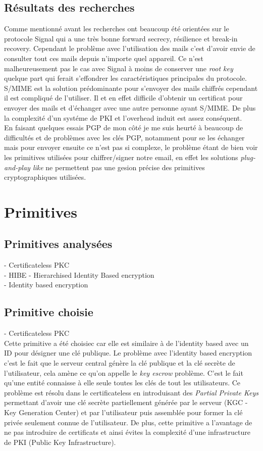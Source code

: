 \subsection{Résultats des recherches}
Comme mentionné avant les recherches ont beaucoup été orientées sur le protocole Signal qui a une très bonne forward secrecy, résilience et break-in recovery. Cependant le problème avec l'utilisation des mails c'est d'avoir envie de consulter tout ces mails depuis n'importe quel appareil. Ce n'est malheureusement pas le cas avec Signal à moins de conserver une \textit{root key} quelque part qui ferait s'effondrer les caractéristiques principales du protocole.\\
S/MIME est la solution prédominante pour s'envoyer des mails chiffrés cependant il est compliqué de l'utiliser. Il et en effet difficile d'obtenir un certificat pour envoyer des mails et d'échanger avec une autre personne ayant S/MIME. De plus la complexité d'un systéme de PKI et l'overhead induit est assez conséquent.\\
En faisant quelques essais PGP de mon côté je me suis heurté à beaucoup de difficultés et de problèmes avec les clés PGP, notamment pour se les échanger mais pour envoyer ensuite ce n'est pas si complexe, le problème étant de bien voir les primitives utilisées pour chiffrer/signer notre email, en effet les solutions \textit{plug-and-play like} ne permettent pas une gesion précise des primitives cryptographiques utilisées.
\section{Primitives}
\subsection{Primitives analysées}
- Certificateless PKC~\cite{DBLP:conf/asiacrypt/Al-RiyamiP03}\\
- HIBE - Hierarchised Identity Based encryption\\
- Identity based encryption~\cite{DBLP:conf/crypto/Shamir84}
\subsection{Primitive choisie}
- Certificateless PKC~\cite{DBLP:conf/asiacrypt/Al-RiyamiP03}\\
 Cette primitive a été choisiec car elle est similaire à de l'identity based avec un ID pour désigner une clé publique. Le problème avec l'identity based encryption c'est le fait que le serveur central génère la clé publique et la clé secrète de l'utilisateur, cela amène ce qu'on appelle le \textit{key escrow} problème. C'est le fait qu'une entité connaisse à elle seule toutes les clés de tout les utilisateurs. Ce problème est résolu dans le certificateless en introduisant des \textit{Partial Private Keys} permettant d'avoir une clé secrète partiellement générée par le serveur (KGC - Key Generation Center) et par l'utilisateur puis assemblée pour former la clé privée seulement connue de l'utilisateur. De plus, cette primitive a l'avantage de ne pas introduire de certificats et ainsi évites la complexité d'une infrastructure de PKI (Public Key Infrastructure).
